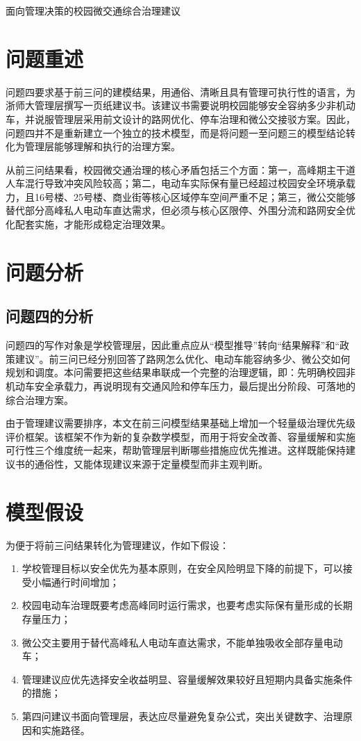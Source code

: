 \documentclass[UTF8,zihao=-4,a4paper]{ctexart}
\begin{document}
\begin{center}
{\heiti{} 面向管理决策的校园微交通综合治理建议}
\end{center}

\section{问题重述}

问题四要求基于前三问的建模结果，用通俗、清晰且具有管理可执行性的语言，为浙师大管理层撰写一页纸建议书。该建议书需要说明校园能够安全容纳多少非机动车，并说服管理层采用前文设计的路网优化、停车治理和微公交接驳方案。因此，问题四并不是重新建立一个独立的技术模型，而是将问题一至问题三的模型结论转化为管理层能够理解和执行的治理方案。

从前三问结果看，校园微交通治理的核心矛盾包括三个方面：第一，高峰期主干道人车混行导致冲突风险较高；第二，电动车实际保有量已经超过校园安全环境承载力，且16号楼、25号楼、商业街等核心区域停车空间严重不足；第三，微公交能够替代部分高峰私人电动车直达需求，但必须与核心区限停、外围分流和路网安全优化配套实施，才能形成稳定治理效果。

\section{问题分析}

\subsection{问题四的分析}

问题四的写作对象是学校管理层，因此重点应从“模型推导”转向“结果解释”和“政策建议”。前三问已经分别回答了路网怎么优化、电动车能容纳多少、微公交如何规划和调度。本问需要把这些结果串联成一个完整的治理逻辑，即：先明确校园非机动车安全承载力，再说明现有交通风险和停车压力，最后提出分阶段、可落地的综合治理方案。

由于管理建议需要排序，本文在前三问模型结果基础上增加一个轻量级治理优先级评价框架。该框架不作为新的复杂数学模型，而用于将安全改善、容量缓解和实施可行性三个维度统一起来，帮助管理层判断哪些措施应优先推进。这样既能保持建议书的通俗性，又能体现建议来源于定量模型而非主观判断。

\section{模型假设}

为便于将前三问结果转化为管理建议，作如下假设：
\begin{enumerate}
    \item 学校管理目标以安全优先为基本原则，在安全风险明显下降的前提下，可以接受小幅通行时间增加；
    \item 校园电动车治理既要考虑高峰同时运行需求，也要考虑实际保有量形成的长期存量压力；
    \item 微公交主要用于替代高峰私人电动车直达需求，不能单独吸收全部存量电动车；
    \item 管理建议应优先选择安全收益明显、容量缓解效果较好且短期内具备实施条件的措施；
    \item 第四问建议书面向管理层，表达应尽量避免复杂公式，突出关键数字、治理原因和实施路径。
\end{enumerate}
\end{document}
